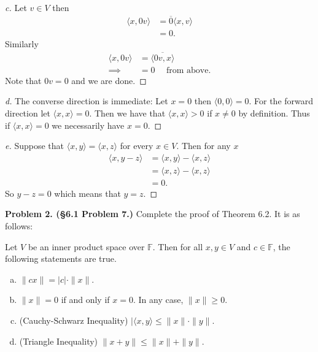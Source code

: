\documentclass[leqno]{article}
\theoremstyle{nonumberplain}
\newtheorem{proof}{Proof}
\newcommand{\F}{\mathbb{F}}
\begin{document}
\begin{proof}[c]
Let $v\in V$ then
\begin{align*}
\langle x,0v \rangle &= \overline{0} \langle x,v \rangle\\
&=0.
\end{align*}
Similarly
\begin{align*}
\langle x,0v \rangle &= \overline{ \langle 0v,x \rangle}\\
\implies &=0 \textrm{~~~ from above}.
\end{align*}
Note that $0v=0$ and we are done.
\end{proof}

\begin{proof}[d]
The converse direction is immediate: Let $x=0$ then $\langle 0,0 \rangle =0$.  For the forward direction let $\langle x,x\rangle =0$.  Then we have that $\langle x,x \rangle >0$ if $x\neq 0$ by definition.  Thus if $\langle x,x \rangle =0$ we necessarily have $x=0$.

\end{proof}

\begin{proof}[e]
Suppose that $\langle x,y \rangle = \langle x,z \rangle$ for every $x \in V$.  Then for any $x$
\begin{align*}
\langle x,y-z \rangle &= \langle x,y \rangle - \langle x,z \rangle\\
&= \langle x,z \rangle - \langle x,z \rangle\\
&= 0.
\end{align*} 
So $y-z=0$ which means that $y=z$.
\end{proof}



\pagebreak



\noindent\textbf{Problem 2. (\S 6.1 Problem 7.)} Complete the proof of Theorem 6.2. It is as follows:

\noindent Let $V$ be an inner product space over $\mathbb{F}$. Then for all $x,y\in V$ and $c\in \F$, the following statements are true.
\begin{enumerate}[(a)]
\item $\|cx\|=|c|\cdot \|x\|$.
\item $\|x\|=0$ if and only if $x=0$. In any case, $\|x\|\geq 0$.
\item (Cauchy-Schwarz Inequality) $|\langle x,y \rangle\leq \|x\|\cdot \|y\|$.
\item (Triangle Inequality) $\|x+y\| \leq \|x\|+\|y\|$.
\end{enumerate}
\end{document}
